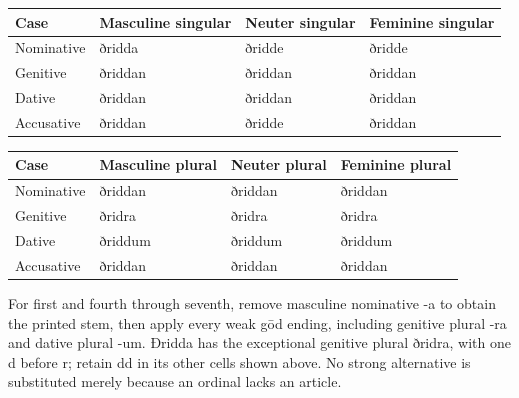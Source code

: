 \par\begingroup
\fontsize{10.5}{13.2}\selectfont
\setlength{\LTleft}{0pt}\setlength{\LTright}{\fill}
\noindent
\begin{tabular}{@{}>{\raggedright\arraybackslash}p{22.0mm}>{\raggedright\arraybackslash}p{31.188mm}>{\raggedright\arraybackslash}p{31.188mm}>{\raggedright\arraybackslash}p{31.188mm}@{}}
\toprule
\textbf{Case} & \textbf{Masculine singular} & \textbf{Neuter singular} & \textbf{Feminine singular} \\
\midrule
Nominative & ðridda & ðridde & ðridde \\
Genitive & ðriddan & ðriddan & ðriddan \\
Dative & ðriddan & ðriddan & ðriddan \\
Accusative & ðriddan & ðridde & ðriddan \\
\bottomrule
\end{tabular}
\par\endgroup
\par\addvspace{5pt}
\par\begingroup
\fontsize{10.5}{13.2}\selectfont
\setlength{\LTleft}{0pt}\setlength{\LTright}{\fill}
\noindent
\begin{tabular}{@{}>{\raggedright\arraybackslash}p{22.0mm}>{\raggedright\arraybackslash}p{31.188mm}>{\raggedright\arraybackslash}p{31.188mm}>{\raggedright\arraybackslash}p{31.188mm}@{}}
\toprule
\textbf{Case} & \textbf{Masculine plural} & \textbf{Neuter plural} & \textbf{Feminine plural} \\
\midrule
Nominative & ðriddan & ðriddan & ðriddan \\
Genitive & ðridra & ðridra & ðridra \\
Dative & ðriddum & ðriddum & ðriddum \\
Accusative & ðriddan & ðriddan & ðriddan \\
\bottomrule
\end{tabular}
\par\endgroup
For first and fourth through seventh, remove masculine nominative -a to obtain the printed stem, then apply every weak gōd ending, including genitive plural -ra and dative plural -um. Ðridda has the exceptional genitive plural ðridra, with one d before r; retain dd in its other cells shown above. No strong alternative is substituted merely because an ordinal lacks an article.


